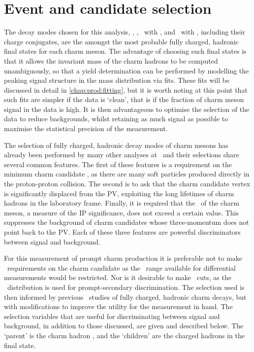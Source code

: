 \chapter{Event and candidate selection}
\label{chap:prod:sel}

The decay modes chosen for this analysis,
\DzToKpi, \DpToKpipi, \DspTophipi\ with \phiToKK, and \DstToDzpi\ with 
\DzToKpi, including their charge conjugates, are the amongst the most probable 
fully charged, hadronic final states for each charm meson.
The advantage of choosing such final states is that it allows the invariant 
mass of the charm hadrons to be computed unambiguously, so that a yield 
determination can be performed by modelling the peaking signal structure in the 
mass distribution via fits.
These fits will be discussed in detail in \cref{chap:prod:fitting}, but it is 
worth noting at this point that such fits are simpler if the data is `clean', 
that is if the fraction of charm meson signal in the data is high.
It is then advantageous to optimise the selection of the data to reduce 
backgrounds, whilst retaining as much signal as possible to maximise the 
statistical precision of the measurement.

The selection of fully charged, hadronic decay modes of charm mesons has 
already been performed by many other analyses at \lhcb\footnotemark\ and their 
selections share several common features.
The first of these features is a requirement on the minimum charm candidate 
\pT, as there are many soft particles produced directly in the proton-proton 
collision.
The second is to ask that the charm candidate vertex is significantly displaced 
from the \ac{PV}, exploiting the long lifetimes of charm hadrons in the 
laboratory frame.
Finally, it is required that the \ipchisq\ of the charm meson, a measure of the 
\acf{IP} significance, does not exceed a certain value.
This suppresses the background of charm candidates whose three-momentum does 
not point back to the \ac{PV}.
Each of these three features are powerful discriminators between signal and 
background.

For this measurement of prompt charm production it is preferable not to make 
\pT\ requirements on the charm candidate as the \pT\ range available for 
differential measurements would be restricted.
Nor is it desirable to make \ipchisq\ cuts, as the \ipchisq\ distribution is 
used for prompt-secondary discrimination.
The selection used is then informed by previous \lhcb\ studies of fully 
charged, hadronic charm decays, but with modifications to improve the utility 
for the measurement in hand.
The selection variables that are useful for discriminating between signal and 
background, in addition to those discussed, are given and described below.
The `parent' is the charm hadron \PHc, and the `children' are the charged 
hadrons in the final state.

